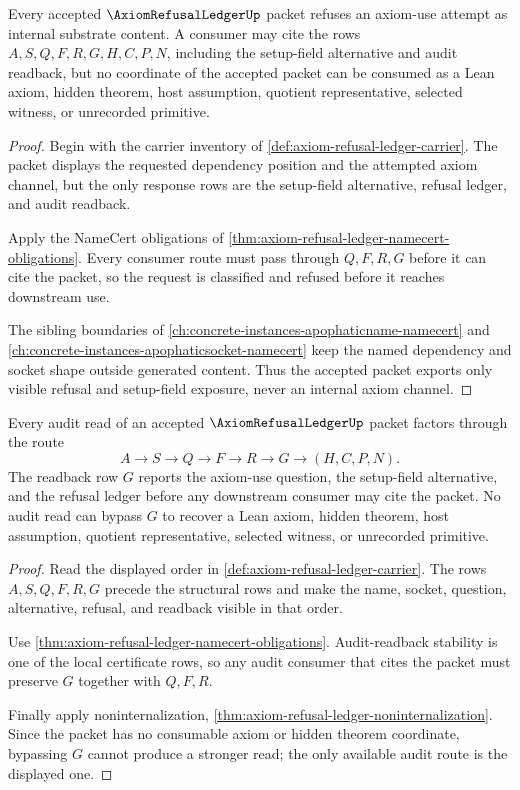 \begin{theorem}
\label{thm:axiom-refusal-ledger-noninternalization}
Every accepted $\AxiomRefusalLedgerUp$ packet refuses an axiom-use attempt as internal substrate content. A consumer may cite the rows $A,S,Q,F,R,G,H,C,P,N$, including the setup-field alternative and audit readback, but no coordinate of the accepted packet can be consumed as a Lean axiom, hidden theorem, host assumption, quotient representative, selected witness, or unrecorded primitive.
\end{theorem}
\begin{proof}
Begin with the carrier inventory of \autoref{def:axiom-refusal-ledger-carrier}. The packet displays the requested dependency position and the attempted axiom channel, but the only response rows are the setup-field alternative, refusal ledger, and audit readback.

Apply the NameCert obligations of \autoref{thm:axiom-refusal-ledger-namecert-obligations}. Every consumer route must pass through $Q,F,R,G$ before it can cite the packet, so the request is classified and refused before it reaches downstream use.

The sibling boundaries of \autoref{ch:concrete-instances-apophaticname-namecert} and \autoref{ch:concrete-instances-apophaticsocket-namecert} keep the named dependency and socket shape outside generated content. Thus the accepted packet exports only visible refusal and setup-field exposure, never an internal axiom channel.
\end{proof}

\begin{theorem}
\label{thm:axiom-refusal-ledger-gate-readback}
Every audit read of an accepted $\AxiomRefusalLedgerUp$ packet factors through the route
$$
A \to S \to Q \to F \to R \to G \to (H,C,P,N).
$$
The readback row $G$ reports the axiom-use question, the setup-field alternative, and the refusal ledger before any downstream consumer may cite the packet. No audit read can bypass $G$ to recover a Lean axiom, hidden theorem, host assumption, quotient representative, selected witness, or unrecorded primitive.
\end{theorem}
\begin{proof}
Read the displayed order in \autoref{def:axiom-refusal-ledger-carrier}. The rows $A,S,Q,F,R,G$ precede the structural rows and make the name, socket, question, alternative, refusal, and readback visible in that order.

Use \autoref{thm:axiom-refusal-ledger-namecert-obligations}. Audit-readback stability is one of the local certificate rows, so any audit consumer that cites the packet must preserve $G$ together with $Q,F,R$.

Finally apply noninternalization, \autoref{thm:axiom-refusal-ledger-noninternalization}. Since the packet has no consumable axiom or hidden theorem coordinate, bypassing $G$ cannot produce a stronger read; the only available audit route is the displayed one.
\end{proof}

